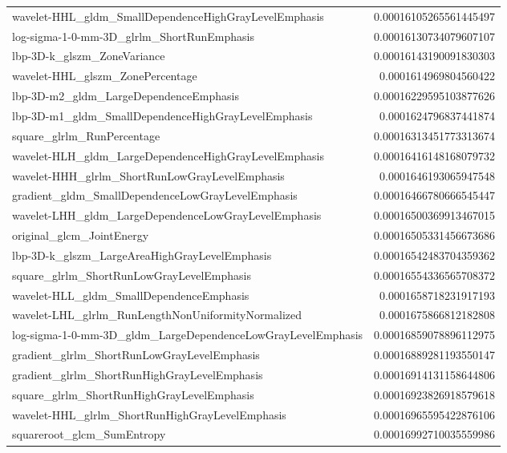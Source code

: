 {\begin{xltabular}[H]{\textwidth}{X r}
        wavelet-HHL\_gldm\_SmallDependenceHighGrayLevelEmphasis & 0.00016105265561445497 \\
        log-sigma-1-0-mm-3D\_glrlm\_ShortRunEmphasis & 0.00016130734079607107 \\
        lbp-3D-k\_glszm\_ZoneVariance & 0.00016143190091830303 \\
        wavelet-HHL\_glszm\_ZonePercentage & 0.0001614969804560422 \\
        lbp-3D-m2\_gldm\_LargeDependenceEmphasis & 0.00016229595103877626 \\
        lbp-3D-m1\_gldm\_SmallDependenceHighGrayLevelEmphasis & 0.0001624796837441874 \\
        square\_glrlm\_RunPercentage & 0.00016313451773313674 \\
        wavelet-HLH\_gldm\_LargeDependenceHighGrayLevelEmphasis & 0.00016416148168079732 \\
        wavelet-HHH\_glrlm\_ShortRunLowGrayLevelEmphasis & 0.0001646193065947548 \\
        gradient\_gldm\_SmallDependenceLowGrayLevelEmphasis & 0.00016466780666545447 \\
        wavelet-LHH\_gldm\_LargeDependenceLowGrayLevelEmphasis & 0.00016500369913467015 \\
        original\_glcm\_JointEnergy & 0.00016505331456673686 \\
        lbp-3D-k\_glszm\_LargeAreaHighGrayLevelEmphasis & 0.00016542483704359362 \\
        square\_glrlm\_ShortRunLowGrayLevelEmphasis & 0.00016554336565708372 \\
        wavelet-HLL\_gldm\_SmallDependenceEmphasis & 0.0001658718231917193 \\
        wavelet-LHL\_glrlm\_RunLengthNonUniformityNormalized & 0.0001675866812182808 \\
        log-sigma-1-0-mm-3D\_gldm\_LargeDependenceLowGrayLevelEmphasis & 0.00016859078896112975 \\
        gradient\_glrlm\_ShortRunLowGrayLevelEmphasis & 0.00016889281193550147 \\
        gradient\_glrlm\_ShortRunHighGrayLevelEmphasis & 0.00016914131158644806 \\
        square\_glrlm\_ShortRunHighGrayLevelEmphasis & 0.00016923826918579618 \\
        wavelet-HHL\_glrlm\_ShortRunHighGrayLevelEmphasis & 0.00016965595422876106 \\
        squareroot\_glcm\_SumEntropy & 0.00016992710035559986 \\

\end{xltabular}}
